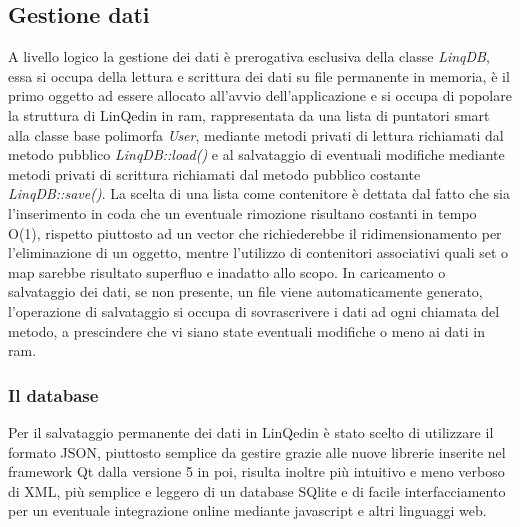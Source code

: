 \subsection*{Gestione dati}
A livello logico la gestione dei dati è prerogativa esclusiva della classe \textit{LinqDB}, essa si occupa della lettura e scrittura dei dati
su file permanente in memoria, è il primo oggetto ad essere allocato all'avvio dell'applicazione e si occupa di popolare la struttura di
LinQedin in ram, rappresentata da una lista di puntatori smart alla classe base polimorfa \textit{User}, mediante metodi privati di lettura
richiamati dal metodo pubblico \textit{LinqDB::load()} e al salvataggio di eventuali modifiche mediante metodi privati di scrittura richiamati
dal metodo pubblico costante \textit{LinqDB::save()}.
La scelta di una lista come contenitore è dettata dal fatto che sia l'inserimento in coda che un eventuale rimozione risultano costanti in tempo O(1),
rispetto piuttosto ad un vector che richiederebbe il ridimensionamento per l'eliminazione di un oggetto, mentre l'utilizzo di contenitori associativi
quali set o map sarebbe risultato superfluo e inadatto allo scopo.
In caricamento o salvataggio dei dati, se non presente, un file viene automaticamente generato, l'operazione di salvataggio si occupa di sovrascrivere
i dati ad ogni chiamata del metodo, a prescindere che vi siano state eventuali modifiche o meno ai dati in ram.
\subsubsection*{Il database}
Per il salvataggio permanente dei dati in LinQedin è stato scelto di utilizzare il formato JSON, piuttosto semplice da gestire grazie alle
nuove librerie inserite nel framework Qt dalla versione 5 in poi, risulta inoltre più intuitivo e meno verboso di XML, più semplice e leggero
di un database SQlite e di facile interfacciamento per un eventuale integrazione online mediante javascript e altri linguaggi web.